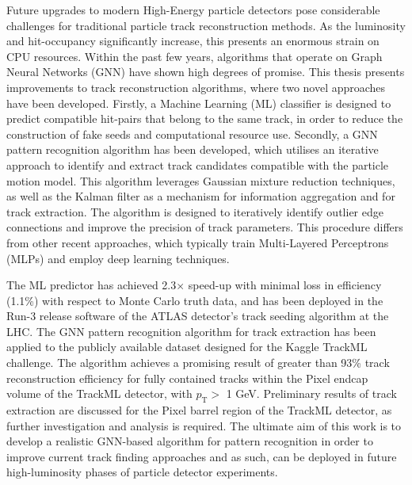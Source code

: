 Future upgrades to modern High-Energy particle detectors pose considerable challenges for traditional particle track reconstruction methods. As the luminosity and hit-occupancy significantly increase, this presents an enormous strain on CPU resources. Within the past few years, algorithms that operate on Graph Neural Networks (GNN) have shown high degrees of promise. This thesis presents improvements to track reconstruction algorithms, where two novel approaches have been developed. Firstly, a Machine Learning (ML) classifier is designed to predict compatible hit-pairs that belong to the same track, in order to reduce the construction of fake seeds and computational resource use. Secondly, a GNN pattern recognition algorithm has been developed, which utilises an iterative approach to identify and extract track candidates compatible with the particle motion model. This algorithm leverages Gaussian mixture reduction techniques, as well as the Kalman filter as a mechanism for information aggregation and for track extraction. The algorithm is designed to iteratively identify outlier edge connections and improve the precision of track parameters. This procedure differs from other recent approaches, which typically train Multi-Layered Perceptrons (MLPs) and employ deep learning techniques. 

The ML predictor has achieved 2.3$\times$ speed-up with minimal loss in efficiency (1.1\%) with respect to Monte Carlo truth data, and has been deployed in the Run-3 release software of the ATLAS detector’s track seeding algorithm at the LHC. The GNN pattern recognition algorithm for track extraction has been applied to the publicly available dataset designed for the Kaggle TrackML challenge. The algorithm achieves a promising result of greater than 93\% track reconstruction efficiency for fully contained tracks within the Pixel endcap volume of the TrackML detector, with $p_{\text{T}} >$ 1 GeV. Preliminary results of track extraction are discussed for the Pixel barrel region of the TrackML detector, as further investigation and analysis is required. The ultimate aim of this work is to develop a realistic GNN-based algorithm for pattern recognition in order to improve current track finding approaches and as such, can be deployed in future high-luminosity phases of particle detector experiments.
